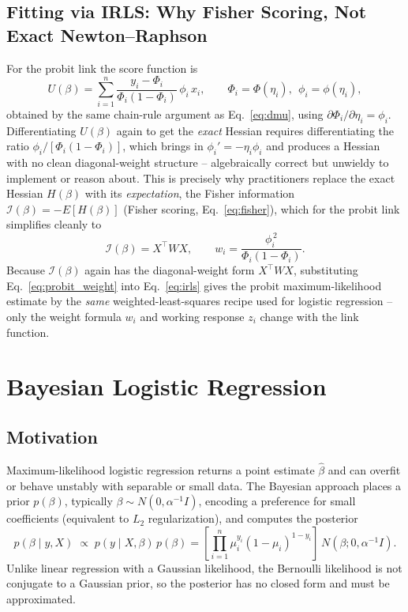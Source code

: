\documentclass[a4paper,11pt]{article}
\begin{document}
\subsection{Fitting via IRLS: Why Fisher Scoring, Not Exact Newton--Raphson}
For the probit link the score function is
\begin{equation}
U(\beta) = \sum_{i=1}^n \frac{y_i-\Phi_i}{\Phi_i(1-\Phi_i)}\,\phi_i\, x_i, \qquad \Phi_i=\Phi(\eta_i),\ \ \phi_i=\phi(\eta_i),
\end{equation}
obtained by the same chain-rule argument as Eq.~\eqref{eq:dmu}, using $\partial \Phi_i/\partial\eta_i = \phi_i$. Differentiating $U(\beta)$ again to get the \emph{exact} Hessian requires differentiating the ratio $\phi_i/[\Phi_i(1-\Phi_i)]$, which brings in $\phi_i'=-\eta_i\phi_i$ and produces a Hessian with no clean diagonal-weight structure -- algebraically correct but unwieldy to implement or reason about. This is precisely why practitioners replace the exact Hessian $H(\beta)$ with its \emph{expectation}, the Fisher information $\mathcal{I}(\beta)=-E[H(\beta)]$ (Fisher scoring, Eq.~\eqref{eq:fisher}), which for the probit link simplifies cleanly to
\begin{equation}
\mathcal{I}(\beta) = X^\top W X, \qquad w_i = \frac{\phi_i^{\,2}}{\Phi_i(1-\Phi_i)}.
\label{eq:probit_weight}
\end{equation}
Because $\mathcal{I}(\beta)$ again has the diagonal-weight form $X^\top W X$, substituting Eq.~\eqref{eq:probit_weight} into Eq.~\eqref{eq:irls} gives the probit maximum-likelihood estimate by the \emph{same} weighted-least-squares recipe used for logistic regression -- only the weight formula $w_i$ and working response $z_i$ change with the link function.

\section{Bayesian Logistic Regression}

\subsection{Motivation}
Maximum-likelihood logistic regression returns a point estimate $\hat\beta$ and can overfit or behave unstably with separable or small data. The Bayesian approach places a prior $p(\beta)$, typically $\beta \sim N(0, \alpha^{-1} I)$, encoding a preference for small coefficients (equivalent to $L_2$ regularization), and computes the posterior
\begin{equation}
p(\beta \mid y, X) \;\propto\; p(y \mid X, \beta)\, p(\beta) = \left[\prod_{i=1}^n \mu_i^{y_i}(1-\mu_i)^{1-y_i}\right] \, N(\beta; 0, \alpha^{-1}I).
\end{equation}
Unlike linear regression with a Gaussian likelihood, the Bernoulli likelihood is not conjugate to a Gaussian prior, so the posterior has no closed form and must be approximated.
\end{document}
